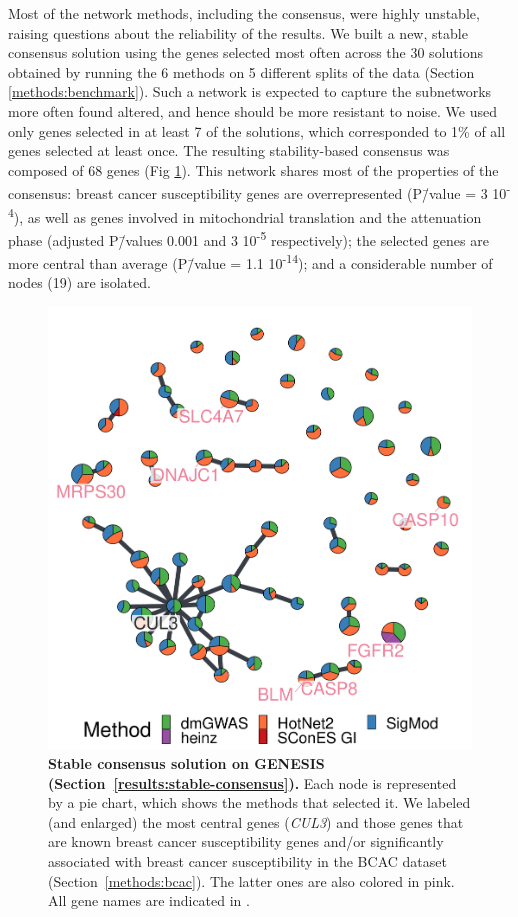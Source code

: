 \documentclass[10pt,letterpaper]{article}
\begin{document}
Most of the network methods, including the consensus, were highly unstable, raising questions about the reliability of the results. We built a new, stable consensus solution using the genes selected most often across the 30 solutions obtained by running the 6 methods on 5 different splits of the data (Section \ref{methods:benchmark}). Such a network is expected to capture the subnetworks more often found altered, and hence should be more resistant to noise. We used only genes selected in at least 7 of the solutions, which corresponded to 1\% of all genes selected at least once. The resulting stability-based consensus was composed of 68 genes (Fig \ref{fig:stable-consensus}). This network shares most of the properties of the consensus: breast cancer susceptibility genes are overrepresented (P\=/value = 3 \texttimes{} 10\textsuperscript{-4}), as well as genes involved in mitochondrial translation and the attenuation phase (adjusted P\=/values 0.001 and 3 \texttimes{} 10\textsuperscript{-5} respectively); the selected genes are more central than average (P\=/value = 1.1 \texttimes{} 10\textsuperscript{-14}); and a considerable number of nodes (19) are isolated.

\begin{figure}[!ht]
  \centering
  \includegraphics[width=.7\linewidth]{./figures/figure_5.pdf}
  \caption{{\bf Stable consensus solution on GENESIS (Section~\ref{results:stable-consensus}).} Each node is represented by a pie chart, which shows the methods that selected it. We labeled (and enlarged) the most central genes (\emph{CUL3}) and those genes that are known breast cancer susceptibility genes and/or significantly associated with breast cancer susceptibility in the BCAC dataset (Section~\ref{methods:bcac}). The latter ones are also colored in pink. All gene names are indicated in .}
  \label{fig:stable-consensus}
  \end{figure}
\end{document}
